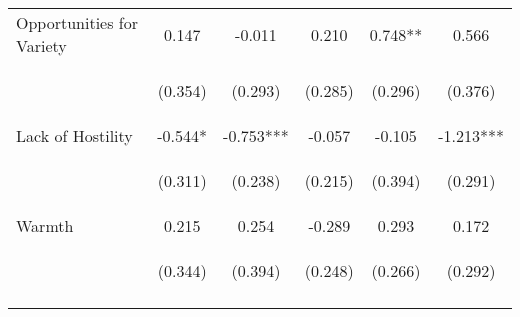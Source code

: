 \begin{tabular}{lccccc}
\noalign{\smallskip}Opportunities for Variety & 0.147 & -0.011 & 0.210 & 0.748** & 0.566\\
 & \begin{footnotesize}(0.354)\end{footnotesize} & \begin{footnotesize}(0.293)\end{footnotesize} & \begin{footnotesize}(0.285)\end{footnotesize} & \begin{footnotesize}(0.296)\end{footnotesize} & \begin{footnotesize}(0.376)\end{footnotesize}\\
\noalign{\smallskip}Lack of Hostility & -0.544* & -0.753*** & -0.057 & -0.105 & -1.213***\\
 & \begin{footnotesize}(0.311)\end{footnotesize} & \begin{footnotesize}(0.238)\end{footnotesize} & \begin{footnotesize}(0.215)\end{footnotesize} & \begin{footnotesize}(0.394)\end{footnotesize} & \begin{footnotesize}(0.291)\end{footnotesize}\\
\noalign{\smallskip}Warmth & 0.215 & 0.254 & -0.289 & 0.293 & 0.172\\
 & \begin{footnotesize}(0.344)\end{footnotesize} & \begin{footnotesize}(0.394)\end{footnotesize} & \begin{footnotesize}(0.248)\end{footnotesize} & \begin{footnotesize}(0.266)\end{footnotesize} & \begin{footnotesize}(0.292)\end{footnotesize}\\
\noalign{\smallskip}\hline\end{tabular}\\
